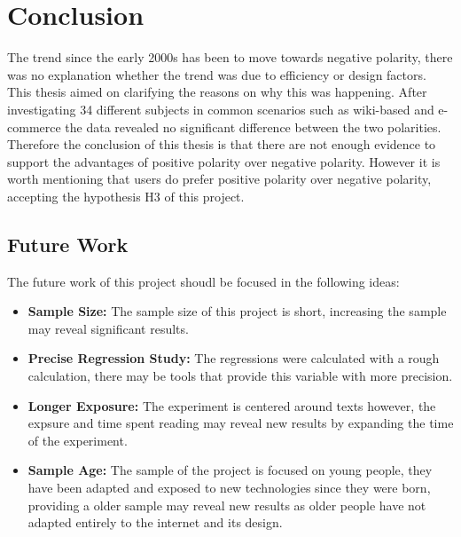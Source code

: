 \chapter{Conclusion}
\label{chap:conclusion_and_future_work}
The trend since the early 2000s has been to move towards negative polarity, there was no explanation
whether the trend was due to efficiency or design factors. This thesis aimed on clarifying the reasons 
on why this was happening. After investigating 34 different subjects in common scenarios such as wiki-based
 and e-commerce the data revealed no significant difference between the two polarities. Therefore the conclusion 
 of this thesis is that there are not enough evidence to support the advantages of positive polarity over negative polarity.
However it is worth mentioning that users do prefer positive polarity over negative polarity, accepting the hypothesis H3 of this project.

\section{Future Work}
The future work of this project shoudl be focused in the following ideas:
\begin{itemize}
    \item \textbf{Sample Size:} The sample size of this project is short, increasing the sample may reveal significant results.
    \item \textbf{Precise Regression Study:} The regressions were calculated with a rough calculation, there may be tools
    that provide this variable with more precision.
    \item \textbf{Longer Exposure:} The experiment is centered around texts however, the expsure and time spent reading may reveal new 
    results by expanding the time of the experiment.
    \item \textbf{Sample Age:} The sample of the project is focused on young people, they have been adapted and exposed to new technologies
    since they were born, providing a older sample may reveal new results as older people have not adapted entirely to the internet and its design.
\end{itemize}
